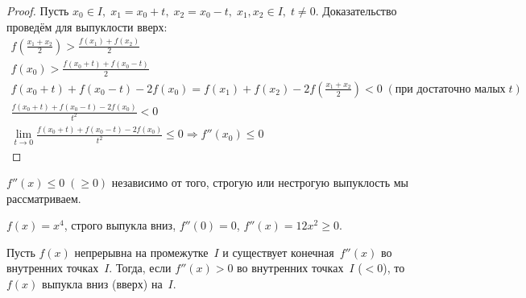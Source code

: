\begin{proof}
Пусть \(x_0 \in I, \; x_1 = x_0 + t, \; x_2 = x_0 - t, \; x_1, x_2 \in I, \; t \neq 0\).
Доказательство проведём для выпуклости вверх:
\begin{gather}
    f\left(\frac{x_1 + x_2}{2}\right) > \frac{f(x_1) + f(x_2)}{2}\\
    f(x_0) > \frac{f(x_0 + t) + f(x_0 - t)}{2}\\
    f(x_0 + t) + f(x_0 - t) - 2f(x_0) = f(x_1) + f(x_2) - 2f\left(\frac{x_1 + x_2}{2}\right) < 0 \;
        (\text{при достаточно малых} \; t)\\
    \frac{f(x_0 + t) + f(x_0 - t) - 2f(x_0)}{t^2} < 0\\
    \lim_{t \rightarrow 0}{\frac{f(x_0 + t) + f(x_0 - t) - 2f(x_0)}{t^2}} \leq 0 \Rightarrow f''(x_0)
        \leq 0
\end{gather}
\end{proof}

\begin{note}
\(f''(x) \leq 0 \; (\geq 0)\) независимо от того, строгую или нестрогую выпуклость мы рассматриваем.
\end{note}

\begin{example}
\(f(x) = x^4\), строго выпукла вниз, \(f''(0) = 0\), \(f''(x) = 12x^2 \geq 0\).
\end{example}

\begin{theorem}
Пусть \(f(x)\) непрерывна на промежутке~\(I\) и существует конечная~\(f''(x)\) во внутренних
точках~\(I\). Тогда, если \(f''(x) > 0\) во внутренних точках~\(I\) (\(< 0\)), то \(f(x)\) выпукла
вниз (вверх) на~\(I\).
\end{theorem}

